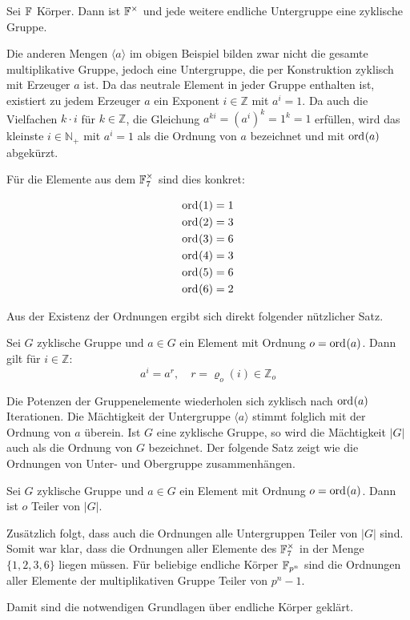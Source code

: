 \begin{satz}
    Sei $\field{}$ Körper. Dann ist $\field{}^\times$ und jede weitere endliche Untergruppe eine zyklische Gruppe. 
\end{satz}

Die anderen Mengen $\langle a \rangle$ im obigen Beispiel bilden zwar nicht die gesamte multiplikative Gruppe, jedoch eine Untergruppe, die per Konstruktion zyklisch mit Erzeuger $a$ ist. Da das neutrale Element in jeder Gruppe enthalten ist, existiert zu jedem Erzeuger $a$ ein Exponent $i \in \mathbb{Z}$ mit $a^i = 1$. Da auch die Vielfachen $k\cdot i$ für $k\in \mathbb{Z}$, die Gleichung $a^{ki} = {(a^i)}^k = 1^k = 1$ erfüllen, wird das kleinste $i \in \mathbb{N}_+$ mit $a^i = 1$ als die Ordnung von $a$ bezeichnet und mit $\ord{a}$ abgekürzt.

Für die Elemente aus dem $\field{7}^\times$ sind dies konkret:

\begin{align*}
    \ord{1} &= 1 \\
    \ord{2} &= 3 \\
    \ord{3} &= 6 \\
    \ord{4} &= 3 \\
    \ord{5} &= 6 \\
    \ord{6} &= 2
\end{align*}

Aus der Existenz der Ordnungen ergibt sich direkt folgender nützlicher Satz.

\begin{satz} \label{satz:cyclicity}
    Sei $G$ zyklische Gruppe und $a \in G$ ein Element mit Ordnung $o = \ord{a}$. Dann gilt für $i \in \mathbb{Z}$:
    \begin{equation*}
        a^i = a^r, \quad r = \varrho_o(i) \in \mathbb{Z}_o
    \end{equation*}
\end{satz}

Die Potenzen der Gruppenelemente wiederholen sich zyklisch nach $\ord{a}$ Iterationen. Die Mächtigkeit der Untergruppe $\langle a \rangle$ stimmt folglich mit der Ordnung von $a$ überein. Ist $G$ eine zyklische Gruppe, so wird die Mächtigkeit $|G|$ auch als die Ordnung von $G$ bezeichnet.
Der folgende Satz zeigt wie die Ordnungen von Unter- und Obergruppe zusammenhängen.

\begin{satz}
    Sei $G$ zyklische Gruppe und $a \in G$ ein Element mit Ordnung $o = \ord{a}$. Dann ist $o$ Teiler von $|G|$.
\end{satz}

Zusätzlich folgt, dass auch die Ordnungen alle Untergruppen Teiler von $|G|$ sind. Somit war klar, dass die Ordnungen aller Elemente des $\field{7}^\times$ in der Menge $\{1,2,3,6\}$ liegen müssen. Für beliebige endliche Körper $\field{p}[n]$ sind die Ordnungen aller Elemente der multiplikativen Gruppe Teiler von $p^n-1$.

Damit sind die notwendigen Grundlagen über endliche Körper geklärt. 